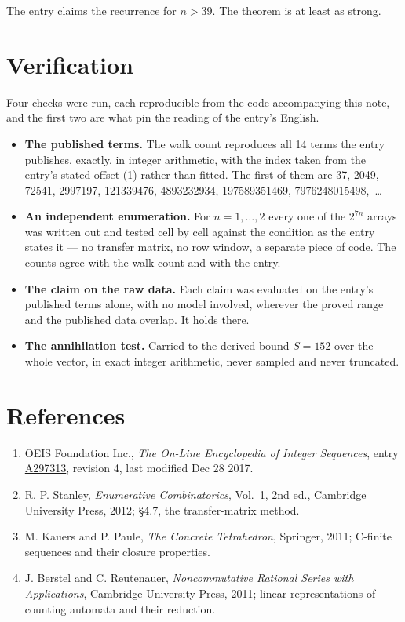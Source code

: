 \documentclass[11pt]{article}
\theoremstyle{definition}
\begin{document}
The entry claims the recurrence for $n > 39$. The theorem is at least as strong.

\section{Verification}

Four checks were run, each reproducible from the code accompanying this note, and the first two are what pin the reading of the entry's English.

\begin{itemize}

\item {\bfseries The published terms.} The walk count reproduces all 14 terms the entry publishes, exactly, in integer arithmetic, with the index taken from the entry's stated offset (1) rather than fitted. The first of them are 37, 2049, 72541, 2997197, 121339476, 4893232934, 197589351469, 7976248015498,~\dots

\item {\bfseries An independent enumeration.} For $n = 1,\dots,2$ every one of the $2^{7n}$ arrays was written out and tested cell by cell against the condition as the entry states it --- no transfer matrix, no row window, a separate piece of code. The counts agree with the walk count and with the entry.

\item {\bfseries The claim on the raw data.} Each claim was evaluated on the entry's published terms alone, with no model involved, wherever the proved range and the published data overlap. It holds there.

\item {\bfseries The annihilation test.} Carried to the derived bound $S = 152$ over the whole vector, in exact integer arithmetic, never sampled and never truncated.

\end{itemize}

\section{References}

\begin{enumerate}

\item OEIS Foundation Inc., \emph{The On-Line Encyclopedia of Integer Sequences}, entry \href{https://oeis.org/A297313}{A297313}, revision 4, last modified Dec 28 2017.

\item R. P. Stanley, \emph{Enumerative Combinatorics}, Vol.~1, 2nd ed., Cambridge University Press, 2012; \S4.7, the transfer-matrix method.

\item M. Kauers and P. Paule, \emph{The Concrete Tetrahedron}, Springer, 2011; C-finite sequences and their closure properties.

\item J. Berstel and C. Reutenauer, \emph{Noncommutative Rational Series with Applications}, Cambridge University Press, 2011; linear representations of counting automata and their reduction.

\end{enumerate}
\end{document}

